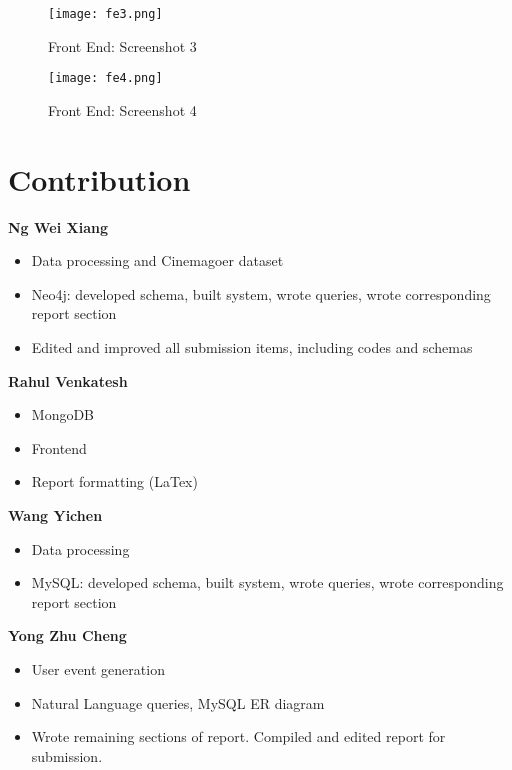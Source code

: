 \documentclass[10pt,titlepage]{article}
\begin{document}
\begin{center}
    \begin{figure}[H]
        \centering
        \texttt{[image: fe3.png]}
        \caption{Front End: Screenshot 3}
        \label{fig:fe3}
    \end{figure}
\end{center}

\begin{center}
    \begin{figure}[H]
        \centering
        \texttt{[image: fe4.png]}
        \caption{Front End: Screenshot 4}
        \label{fig:fe4}
    \end{figure}
\end{center}


\section{Contribution}

\textbf{Ng Wei Xiang}
\begin{itemize}
    \item Data processing and Cinemagoer dataset 

    \item Neo4j: developed schema, built system, wrote queries, wrote corresponding report section 

    \item Edited and improved all submission items, including codes and schemas
\end{itemize}

\textbf{Rahul Venkatesh}
\begin{itemize}
    \item MongoDB
    \item Frontend
    \item Report formatting (LaTex)
\end{itemize}

\textbf{Wang Yichen}
\begin{itemize}
    \item Data processing
    \item MySQL: developed schema, built system, wrote queries, wrote corresponding report section
\end{itemize}

\textbf{Yong Zhu Cheng}
\begin{itemize}
    \item User event generation
    \item Natural Language queries, MySQL ER diagram
    \item Wrote remaining sections of report. Compiled and edited report for submission.
\end{itemize}
\end{document}
